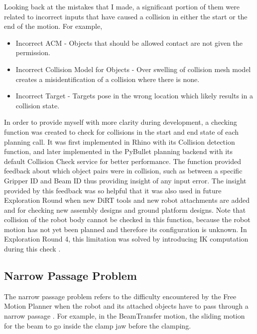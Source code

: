 Looking back at the mistakes that I made, a significant portion of them were related to incorrect inputs that have caused a collision in either the start or the end of the motion. For example, 
\begin{itemize}
    \item Incorrect ACM - Objects that should be allowed contact are not given the permission.
    \item Incorrect Collision Model for Objects - Over swelling of collision mesh model creates a misidentification of a collision where there is none.
    \item Incorrect Target - Targets pose in the wrong location which likely results in a collision state.
\end{itemize}

In order to provide myself with more clarity during development, a checking function was created to check for collisions in the start and end state of each planning call. It was first implemented in Rhino with its Collision detection function, and later implemented in the PyBullet planning backend \parencite{coumansPyBulletPythonModule2016, huangCompas_fab_pychoreo2023} with its default Collision Check service for better performance. The function provided feedback about which object pairs were in collision, such as between a specific Gripper ID and Beam ID thus providing insight of any input error.
The insight provided by this feedback was so helpful that it was also used in future Exploration Round when new DiRT tools and new robot attachments are added and for checking new assembly designs and ground platform designs. 
Note that collision of the robot body cannot be checked in this function, because the robot motion has not yet been planned and therefore its configuration is unknown. In Exploration Round 4, this limitation was solved by introducing IK computation during this check .

\subsection{Narrow Passage Problem}
\label{subsection:exploration-2-narrow-passage-problem}

The narrow passage problem refers to the difficulty encountered by the Free Motion Planner when the robot and its attached objects have to pass through a narrow passage \parencite{lavallePlanningAlgorithms2006}. For example, in the BeamTransfer motion, the sliding motion for the beam to go inside the clamp jaw before the clamping. 

